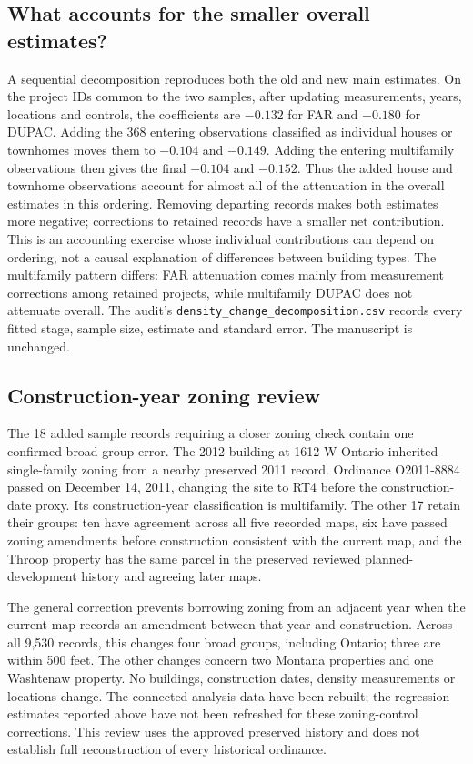 \subsection*{What accounts for the smaller overall estimates?}
A sequential decomposition reproduces both the old and new main estimates. On the project IDs common to the two samples, after updating measurements, years, locations and controls, the coefficients are $-0.132$ for FAR and $-0.180$ for DUPAC. Adding the 368 entering observations classified as individual houses or townhomes moves them to $-0.104$ and $-0.149$. Adding the entering multifamily observations then gives the final $-0.104$ and $-0.152$. Thus the added house and townhome observations account for almost all of the attenuation in the overall estimates in this ordering. Removing departing records makes both estimates more negative; corrections to retained records have a smaller net contribution. This is an accounting exercise whose individual contributions can depend on ordering, not a causal explanation of differences between building types.
The multifamily pattern differs: FAR attenuation comes mainly from measurement corrections among retained projects, while multifamily DUPAC does not attenuate overall. The audit's \texttt{density\_change\_decomposition.csv} records every fitted stage, sample size, estimate and standard error. The manuscript is unchanged.

\subsection*{Construction-year zoning review}
The 18 added sample records requiring a closer zoning check contain one confirmed broad-group error. The 2012 building at 1612 W Ontario inherited single-family zoning from a nearby preserved 2011 record. Ordinance O2011-8884 passed on December 14, 2011, changing the site to RT4 before the construction-date proxy. Its construction-year classification is multifamily. The other 17 retain their groups: ten have agreement across all five recorded maps, six have passed zoning amendments before construction consistent with the current map, and the Throop property has the same parcel in the preserved reviewed planned-development history and agreeing later maps.

The general correction prevents borrowing zoning from an adjacent year when the current map records an amendment between that year and construction. Across all 9,530 records, this changes four broad groups, including Ontario; three are within 500 feet. The other changes concern two Montana properties and one Washtenaw property. No buildings, construction dates, density measurements or locations change. The connected analysis data have been rebuilt; the regression estimates reported above have not been refreshed for these zoning-control corrections. This review uses the approved preserved history and does not establish full reconstruction of every historical ordinance.

